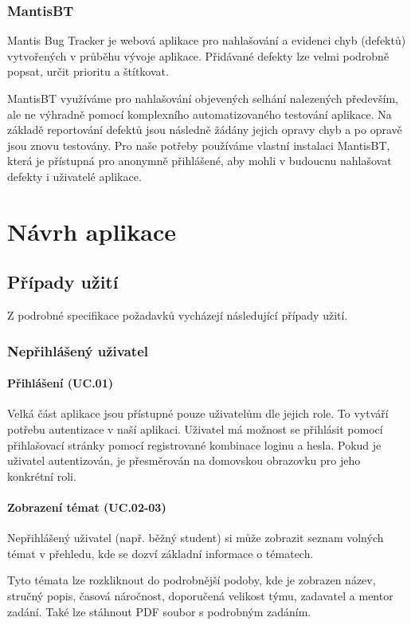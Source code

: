 \documentclass[czech,BP]{thesiskiv}
\begin{document}
\subsection{MantisBT}
	\par Mantis Bug Tracker je webová aplikace pro nahlašování a evidenci chyb (defektů) vytvořených v průběhu vývoje aplikace. Přidávané defekty lze velmi podrobně popsat, určit prioritu a štítkovat.
	\par MantisBT využíváme pro nahlašování objevených selhání nalezených především, ale ne výhradně pomocí komplexního automatizovaného testování aplikace. Na základě reportování defektů jsou následně žádány jejich opravy chyb a po opravě jsou znovu testovány. Pro naše potřeby používáme vlastní instalaci MantisBT, která je přístupná pro anonymně přihlášené, aby mohli v budoucnu nahlašovat defekty i uživatelé aplikace.
\chapter{Návrh aplikace}
	\section{Případy užití}
		\par Z podrobné specifikace požadavků vycházejí následující případy užití.
		\subsection{Nepřihlášený uživatel}
			\subsubsection{Přihlášení (UC.01)}
				\par Velká část aplikace jsou přístupné pouze uživatelům dle jejich role. To vytváří potřebu autentizace v naší aplikaci. Uživatel má možnost se přihlásit pomocí přihlašovací stránky pomocí registrované kombinace loginu a hesla. Pokud je uživatel autentizován, je přesměrován na domovskou obrazovku pro jeho konkrétní roli.
			\subsubsection{Zobrazení témat (UC.02-03)}
				\par Nepřihlášený uživatel (např. běžný student) si může zobrazit seznam volných témat v přehledu, kde se dozví základní informace o tématech.
				\par Tyto témata lze rozkliknout do podrobnější podoby, kde je zobrazen název, stručný popis, časová náročnost, doporučená velikost týmu, zadavatel a mentor zadání. Také lze stáhnout PDF soubor s podrobným zadáním.
\end{document}

